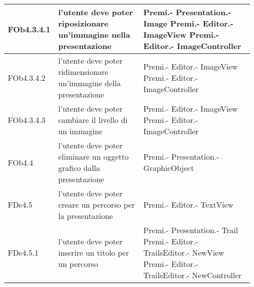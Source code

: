 \begin{longtable}{|l|p{5cm}|p{7cm}|}
\hline
FOb4.3.4.1 & l'utente deve poter riposizionare un'immagine nella presentazione & Premi.- \linebreak Presentation.- \linebreak Image \linebreak Premi.- \linebreak Editor.- \linebreak ImageView \linebreak Premi.- \linebreak Editor.- \linebreak ImageController \linebreak \\
\hline
FOb4.3.4.2 & l'utente deve poter ridimensionare un'immagine della presentazione & Premi.- \linebreak Editor.- \linebreak ImageView \linebreak Premi.- \linebreak Editor.- \linebreak ImageController \linebreak \\
\hline
FOb4.3.4.3 & l'utente deve poter cambiare il livello di un immagine & Premi.- \linebreak Editor.- \linebreak ImageView \linebreak Premi.- \linebreak Editor.- \linebreak ImageController \linebreak \\
\hline
FOb4.4 & l'utente deve poter eliminare un oggetto grafico dalla presentazione & Premi.- \linebreak Presentation.- \linebreak GraphicObject \linebreak \\
\hline
FDe4.5 & l'utente deve poter creare un percorso per la presentazione & Premi.- \linebreak Editor.- \linebreak TextView \linebreak \\
\hline
FDe4.5.1 & l'utente deve poter inserire un titolo per un percorso & Premi.- \linebreak Presentation.- \linebreak Trail \linebreak Premi.- \linebreak Editor.- \linebreak TrailsEditor.- \linebreak NewView \linebreak Premi.- \linebreak Editor.- \linebreak TrailsEditor.- \linebreak NewController \linebreak \\

\end{longtable}
